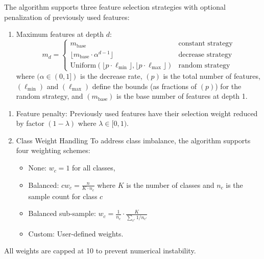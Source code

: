 The algorithm supports three feature selection strategies with optional penalization of previously used features:

\begin{enumerate}
\def\labelenumi{\arabic{enumi}.}
\tightlist
\item
  Maximum features at depth \(d\): \[
  m_d =
  \begin{cases}
  m_{\text{base}} & \text{constant strategy} \\
  \lfloor m_{\text{base}} \cdot \alpha^{d-1} \rfloor & \text{decrease strategy} \\
  \text{Uniform}(\lfloor p \cdot \ell_{\min} \rfloor, \lfloor p \cdot \ell_{\max} \rfloor) & \text{random strategy}
  \end{cases}
  \]where \((\alpha \in (0, 1])\) is the decrease rate, \((p)\) is the total number of features, \((\ell_{\min})\) and \((\ell_{\max})\) define the bounds (as fractions of \((p)\)) for the random strategy, and \((m_{\text{base}})\) is the base number of features at depth 1.
\end{enumerate}

\begin{enumerate}
\def\labelenumi{\arabic{enumi}.}
\setcounter{enumi}{1}
\item
  Feature penalty: Previously used features have their selection weight reduced by factor \((1 - \lambda)\) where \(\lambda \in [0, 1)\).
\item
  Class Weight Handling To address class imbalance, the algorithm supports four weighting schemes:

  \begin{itemize}
  \item
    None: \(w_c = 1\) for all classes,
  \item
    Balanced: \(cw_c = \frac{n}{K \cdot n_c}\) where \(K\) is the number of classes and \(n_c\) is the sample count for class \(c\)
  \item
    Balanced sub-sample: \(w_c = \frac{1}{n_c} \cdot \frac{K}{\sum_{c'} 1/n_{c'}}\)
  \item
    Custom: User-defined weights.
  \end{itemize}
\end{enumerate}

All weights are capped at 10 to prevent numerical instability.



\address{%
Aneesh Agarwal\\
Monash University\\%
\\
%
%
%
\href{mailto:aaga0022@student.monash.edu}{\nolinkurl{aaga0022@student.monash.edu}}%
}

